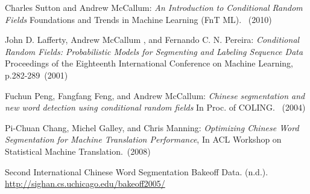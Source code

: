 \documentclass[UTF8,11pt]{article}
\begin{document}
\begin{thebibliography}{99}


 Charles Sutton and Andrew McCallum:
\emph{An Introduction to Conditional Random Fields}
Foundations and Trends in Machine Learning (FnT ML). ~(2010)

John D. Lafferty, Andrew McCallum , and Fernando C. N. Pereira:
\emph{Conditional Random Fields: Probabilistic Models for Segmenting and Labeling Sequence Data} 
Proceedings of the Eighteenth International Conference on Machine Learning, p.282-289~(2001)

Fuchun Peng, Fangfang Feng, and Andrew McCallum:
\emph{Chinese segmentation and new word detection using conditional random fields} 
In Proc. of COLING. ~(2004)

 Pi-Chuan Chang, Michel Galley, and Chris Manning:
\emph{Optimizing Chinese Word Segmentation for Machine Translation Performance},
In ACL Workshop on Statistical Machine Translation.~(2008)


 Second International Chinese Word Segmentation Bakeoff Data. (n.d.). \\
\url{http://sighan.cs.uchicago.edu/bakeoff2005/}


\end{thebibliography}
\end{document}
